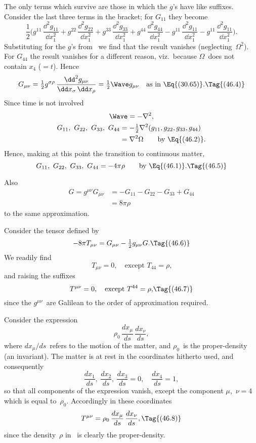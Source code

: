 \documentclass[12pt]{book}
\begin{document}
The only terms which survive are those in which the $g$'s have like suffixes.
Consider the last three terms in the bracket; for $G_{11}$ they become
\[
\frac{1}{2}\biggl(g^{11}\, \frac{\dd^{2} g_{11}}{\dd x_{1}^{2}}
+ g^{22}\, \frac{\dd^{2} g_{22}}{\dd x_{1}^{2}}
+ g^{33}\, \frac{\dd^{2} g_{33}}{\dd x_{1}^{2}}
+ g^{44}\, \frac{\dd^{2} g_{44}}{\dd x_{1}^{2}}
- g^{11}\, \frac{\dd^{2} g_{11}}{\dd x_{1}^{2}}
- g^{11}\, \frac{\dd^{2} g_{11}}{\dd x_{1}^{2}}\biggr).
\]
Substituting for the $g$'s from~ we find that the result vanishes (neglecting~$\Omega^{2}$).
For $G_{44}$ the result vanishes for a different reason, viz.\ because $\Omega$~does not
contain $x_{4}$ ($= t$). Hence
\[
G_{\mu\nu} = \tfrac{1}{2} g^{\sigma\rho}\, \frac{\dd^{2} g_{\mu\nu}}{\dd x_{\sigma}\, \dd x_{\rho}}
= \tfrac{1}{2} \Wave g_{\mu\nu}\quad\text{as in \Eq{(30.65)}.}
\Tag{(46.4)}
\]
Since time is not involved
\begin{gather*}
  \Wave = - \nabla^{2}, \\
  \begin{aligned}
    G_{11},\ G_{22},\ G_{33},\ G_{44}
    &= -\tfrac{1}{2} \nabla^{2}(g_{11}, g_{22}, g_{33}, g_{44}) \\
    &= \nabla^{2}\Omega \qquad\text{by \Eq{(46.2)}.}
  \end{aligned}
\end{gather*}
Hence, making at this point the transition to continuous matter,
\[
G_{11},\ G_{22},\ G_{33},\ G_{44} = -4\pi\rho
\qquad\text{by \Eq{(46.1)}.}
\Tag{(46.5)}
\]

Also
\begin{align*}
  G = g^{\mu\nu} G_{\mu\nu}
  &= -G_{11} - G_{22} - G_{33} + G_{44} \\
  &= 8\pi\rho
  \end{align*}
to the same approximation.

Consider the tensor defined by
%
\[
-8\pi T_{\mu\nu} = G_{\mu\nu} - \tfrac{1}{2} g_{\mu\nu} G.
\Tag{(46.6)}
\]
We readily find
\[
T_{\mu\nu}  = 0,\quad\text{except $T_{44} = \rho$,}
\]
and raising the suffixes
\[
T^{\mu\nu} = 0,\quad\text{except $T^{44} = \rho$,}
\Tag{(46.7)}
\]
since the $g^{\mu\nu}$~are Galilean to the order of approximation required.

Consider the expression
\[
\rho_{0}\, \frac{dx_{\mu}}{ds}\,\frac{dx_{\nu}}{ds},
\]
where $dx_{\mu}/ds$~refers to the motion of the matter, and $\rho_{0}$~is the proper-density
(an invariant). The matter is at rest in the coordinates hitherto used, and
consequently
\[
\frac{dx_{1}}{ds},\
\frac{dx_{2}}{ds},\
\frac{dx_{3}}{ds} = 0,\quad
\frac{dx_{4}}{ds} = 1,
\]
so that all components of the expression vanish, except the component $\mu$,~$\nu = 4$
which is equal to~$\rho_{0}$. Accordingly in these coordinates
\[
T^{\mu\nu} = \rho_{0}\, \frac{dx_{\mu}}{ds}\,\frac{dx_{\nu}}{ds},
\Tag{(46.8)}
\]
since the density~$\rho$ in~ is clearly the proper-density.
\end{document}
